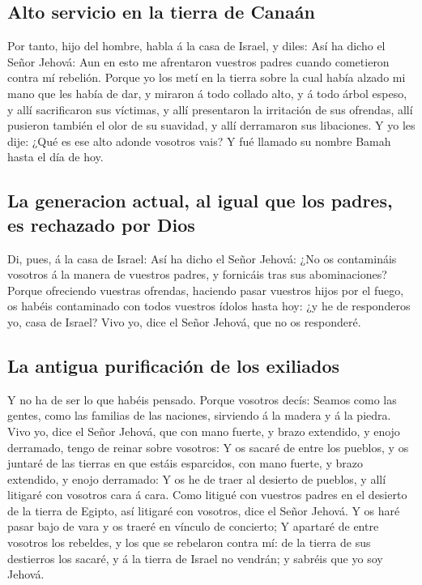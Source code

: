 \hypertarget{alto-servicio-en-la-tierra-de-canauxe1n}{%
\subsection{Alto servicio en la tierra de
Canaán}\label{alto-servicio-en-la-tierra-de-canauxe1n}}

 Por tanto, hijo del hombre, habla á la casa de Israel, y
diles: Así ha dicho el Señor Jehová: Aun en esto me afrentaron vuestros
padres cuando cometieron contra mí rebelión.  Porque yo
los metí en la tierra sobre la cual había alzado mi mano que les había
de dar, y miraron á todo collado alto, y á todo árbol espeso, y allí
sacrificaron sus víctimas, y allí presentaron la irritación de sus
ofrendas, allí pusieron también el olor de su suavidad, y allí
derramaron sus libaciones.  Y yo les dije: ¿Qué es ese
alto adonde vosotros vais? Y fué llamado su nombre Bamah hasta el día de
hoy.

\hypertarget{la-generacion-actual-al-igual-que-los-padres-es-rechazado-por-dios}{%
\subsection{La generacion actual, al igual que los padres, es rechazado
por
Dios}\label{la-generacion-actual-al-igual-que-los-padres-es-rechazado-por-dios}}

 Di, pues, á la casa de Israel: Así ha dicho el Señor
Jehová: ¿No os contamináis vosotros á la manera de vuestros padres, y
fornicáis tras sus abominaciones?  Porque ofreciendo
vuestras ofrendas, haciendo pasar vuestros hijos por el fuego, os habéis
contaminado con todos vuestros ídolos hasta hoy: ¿y he de responderos
yo, casa de Israel? Vivo yo, dice el Señor Jehová, que no os responderé.

\hypertarget{la-antigua-purificaciuxf3n-de-los-exiliados}{%
\subsection{La antigua purificación de los
exiliados}\label{la-antigua-purificaciuxf3n-de-los-exiliados}}

 Y no ha de ser lo que habéis pensado. Porque vosotros
decís: Seamos como las gentes, como las familias de las naciones,
sirviendo á la madera y á la piedra.  Vivo yo, dice el
Señor Jehová, que con mano fuerte, y brazo extendido, y enojo derramado,
tengo de reinar sobre vosotros:  Y os sacaré de entre los
pueblos, y os juntaré de las tierras en que estáis esparcidos, con mano
fuerte, y brazo extendido, y enojo derramado:  Y os he de
traer al desierto de pueblos, y allí litigaré con vosotros cara á cara.
 Como litigué con vuestros padres en el desierto de la
tierra de Egipto, así litigaré con vosotros, dice el Señor Jehová.
 Y os haré pasar bajo de vara y os traeré en vínculo de
concierto;  Y apartaré de entre vosotros los rebeldes, y
los que se rebelaron contra mí: de la tierra de sus destierros los
sacaré, y á la tierra de Israel no vendrán; y sabréis que yo soy Jehová.

